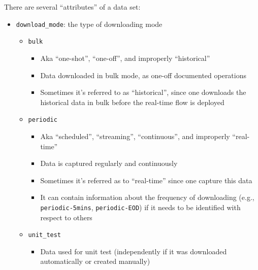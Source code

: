 \documentclass[11pt, reqno]{amsart}
\theoremstyle{definition}
\theoremstyle{remark}
\begin{document}
  There are several ``attributes'' of a data set:

  \begin{itemize}
    \item \verb|download_mode|: the type of downloading mode

      \begin{itemize}
        \item \verb|bulk|

          \begin{itemize}
            \item Aka ``one-shot'', ``one-off'', and improperly ``historical''

            \item Data downloaded in bulk mode, as one-off documented operations

            \item Sometimes it's referred to as ``historical'', since one
              downloads the historical data in bulk before the real-time flow is
              deployed
          \end{itemize}

        \item \verb|periodic|
          \begin{itemize}
            \item Aka ``scheduled'', ``streaming'', ``continuous'', and
              improperly ``real-time''

            \item Data is captured regularly and continuously

            \item Sometimes it's referred as to ``real-time'' since one capture this
              data

            \item It can contain information about the frequency of downloading (e.g.,
              \verb|periodic-5mins|, \verb|periodic-EOD|) if it needs to be
              identified with respect to others
          \end{itemize}

        \item \verb|unit_test|
          \begin{itemize}
            \item Data used for unit test (independently if it was downloaded
              automatically or created manually)
          \end{itemize}
      \end{itemize}


\end{itemize}
\end{document}
